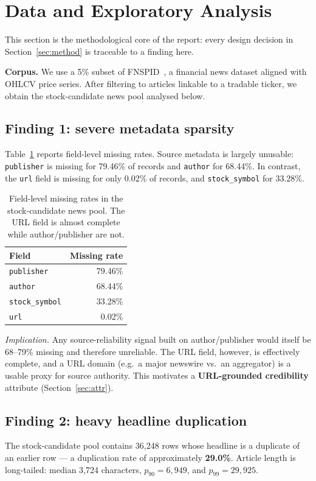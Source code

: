 \documentclass[sigconf,nonacm]{acmart}
\begin{document}
\section{Data and Exploratory Analysis}
\label{sec:eda}
This section is the methodological core of the report: every design
decision in Section~\ref{sec:method} is traceable to a finding here.

\textbf{Corpus.} We use a 5\% subset of FNSPID~\cite{fnspid}, a financial
news dataset aligned with OHLCV price series. After filtering to articles
linkable to a tradable ticker, we obtain the stock-candidate news pool
analysed below.

\subsection{Finding 1: severe metadata sparsity}
Table~\ref{tab:missing} reports field-level missing rates. Source
metadata is largely unusable: \texttt{publisher} is missing for 79.46\%
of records and \texttt{author} for 68.44\%. In contrast, the
\texttt{url} field is missing for only 0.02\% of records, and
\texttt{stock\_symbol} for 33.28\%.

\begin{table}[t]
\caption{Field-level missing rates in the stock-candidate news pool.
The URL field is almost complete while author/publisher are not.}
\label{tab:missing}
\begin{tabular}{lr}
\toprule
Field & Missing rate \\
\midrule
\texttt{publisher}     & 79.46\% \\
\texttt{author}        & 68.44\% \\
\texttt{stock\_symbol} & 33.28\% \\
\texttt{url}           & \phantom{0}0.02\% \\
\bottomrule
\end{tabular}
\end{table}

\emph{Implication.} Any source-reliability signal built on
author/publisher would itself be 68--79\% missing and therefore
unreliable. The URL field, however, is effectively complete, and a URL
domain (e.g.\ a major newswire vs.\ an aggregator) is a usable proxy for
source authority. This motivates a \textbf{URL-grounded credibility}
attribute (Section~\ref{sec:attr}).

\subsection{Finding 2: heavy headline duplication}
The stock-candidate pool contains 36{,}248 rows whose headline is a
duplicate of an earlier row --- a duplication rate of approximately
\textbf{29.0\%}. Article length is long-tailed: median 3{,}724
characters, $p_{90}=6{,}949$, and $p_{99}=29{,}925$.
\end{document}
